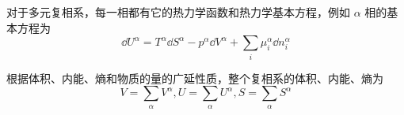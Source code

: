 对于多元复相系，每一相都有它的热力学函数和热力学基本方程，例如 $\alpha$ 相的基本方程为
\begin{equation}
\dd U^\alpha=T^\alpha\dd S^\alpha-p^\alpha\dd V^\alpha+\sum_i\mu_i^\alpha\dd n_i^\alpha
\end{equation}

根据体积、内能、熵和物质的量的广延性质，整个复相系的体积、内能、熵为
\begin{equation}
V=\sum_\alpha V^\alpha,U=\sum_\alpha U^\alpha,S=\sum_\alpha S^\alpha
\end{equation}

